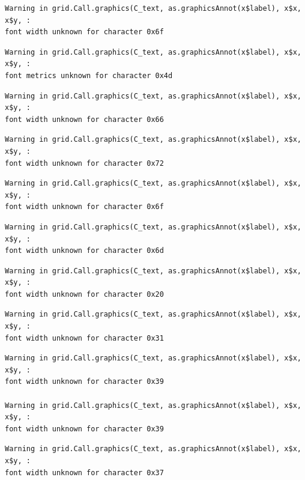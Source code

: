 \documentclass[
  letterpaper,
  DIV=11,
  numbers=noendperiod]{scrreprt}
\begin{document}
\begin{verbatim}
Warning in grid.Call.graphics(C_text, as.graphicsAnnot(x$label), x$x, x$y, :
font width unknown for character 0x6f
\end{verbatim}

\begin{verbatim}
Warning in grid.Call.graphics(C_text, as.graphicsAnnot(x$label), x$x, x$y, :
font metrics unknown for character 0x4d
\end{verbatim}

\begin{verbatim}
Warning in grid.Call.graphics(C_text, as.graphicsAnnot(x$label), x$x, x$y, :
font width unknown for character 0x66
\end{verbatim}

\begin{verbatim}
Warning in grid.Call.graphics(C_text, as.graphicsAnnot(x$label), x$x, x$y, :
font width unknown for character 0x72
\end{verbatim}

\begin{verbatim}
Warning in grid.Call.graphics(C_text, as.graphicsAnnot(x$label), x$x, x$y, :
font width unknown for character 0x6f
\end{verbatim}

\begin{verbatim}
Warning in grid.Call.graphics(C_text, as.graphicsAnnot(x$label), x$x, x$y, :
font width unknown for character 0x6d
\end{verbatim}

\begin{verbatim}
Warning in grid.Call.graphics(C_text, as.graphicsAnnot(x$label), x$x, x$y, :
font width unknown for character 0x20
\end{verbatim}

\begin{verbatim}
Warning in grid.Call.graphics(C_text, as.graphicsAnnot(x$label), x$x, x$y, :
font width unknown for character 0x31
\end{verbatim}

\begin{verbatim}
Warning in grid.Call.graphics(C_text, as.graphicsAnnot(x$label), x$x, x$y, :
font width unknown for character 0x39

Warning in grid.Call.graphics(C_text, as.graphicsAnnot(x$label), x$x, x$y, :
font width unknown for character 0x39
\end{verbatim}

\begin{verbatim}
Warning in grid.Call.graphics(C_text, as.graphicsAnnot(x$label), x$x, x$y, :
font width unknown for character 0x37
\end{verbatim}
\end{document}
